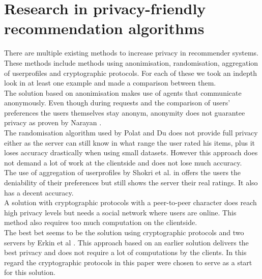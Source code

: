 \documentclass[twocolumn]{phdsymp} %
\begin{document}
\section{Research in privacy-friendly recommendation algorithms}
There are multiple existing methods to increase privacy in recommender systems. These methods include methods using anonimisation, randomisation, aggregation of userprofiles and cryptographic protocols. For each of these we took an indepth look in at least one example and made a comparison between them.\\The solution based on anonimisation \cite{anonimisatie} makes use of agents that communicate anonymously. Even though during requests and the comparison of users' preferences the users themselves stay anonym, anonymity does not guarantee privacy as proven by Narayan \cite{anon}.\\The randomisation algorithm used by Polat and Du \cite{rand} does not provide full privacy either as the server can still know in what range the user rated his items, plus it loses accuracy drastically when using small datasets. However this approach does not demand a lot of work at the clientside and does not lose much accuracy.\\  The use of aggregation of userprofiles by Shokri et al. in \cite{agg} offers the users the deniability of their preferences but still shows the server their real ratings. It also has a decent accuracy.\\ A solution with cryptographic protocols with a peer-to-peer character \cite{social} does reach high privacy levels but needs a social network where users are online. This method also requires too much computation on the clientside.\\ The best bet seems to be the solution using cryptographic protocols and two servers by Erkin et al \cite{dyn}. This approach based on an earlier solution \cite{erkin} delivers the best privacy and does not require a lot of computations by the clients. In this regard the cryptographic protocols in this paper were chosen to serve as a start for this solution.
\end{document}
